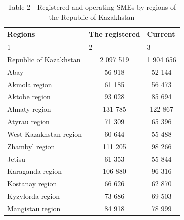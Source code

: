 \begin{table}[H]
\caption*{Table 2 - Registered and operating SMEs by regions of the Republic of Kazakhstan}
\centering
\begin{tabular}{|lcc|}
\hline
\multicolumn{1}{|l|}{Regions}                 & \multicolumn{1}{l|}{The registered} & \multicolumn{1}{l|}{Current} \\ \hline
\multicolumn{1}{|l|}{1}                       & \multicolumn{1}{l|}{2}             & \multicolumn{1}{l|}{3}       \\ \hline
\multicolumn{1}{|l|}{Republic of Kazakhstan}  & \multicolumn{1}{c|}{2 097 519}     & 1 904 656                    \\ \hline
\multicolumn{1}{|l|}{Abay}                    & \multicolumn{1}{c|}{56 918}        & 52 144                       \\ \hline
\multicolumn{1}{|l|}{Akmola region}           & \multicolumn{1}{c|}{61 185}        & 56 473                       \\ \hline
\multicolumn{1}{|l|}{Aktobe region}           & \multicolumn{1}{c|}{93 028}        & 85 694                       \\ \hline
\multicolumn{1}{|l|}{Almaty region}           & \multicolumn{1}{c|}{131 785}       & 122 867                      \\ \hline
\multicolumn{1}{|l|}{Atyrau region}           & \multicolumn{1}{c|}{71 309}        & 65 396                       \\ \hline
\multicolumn{1}{|l|}{West-Kazakhstan region}  & \multicolumn{1}{c|}{60 644}        & 55 488                       \\ \hline
\multicolumn{1}{|l|}{Zhambyl region}          & \multicolumn{1}{c|}{111 205}       & 98 266                       \\ \hline
\multicolumn{1}{|l|}{Jetisu}                  & \multicolumn{1}{c|}{61 353}        & 55 844                       \\ \hline
\multicolumn{1}{|l|}{Karaganda region}        & \multicolumn{1}{c|}{106 880}       & 96 316                       \\ \hline
\multicolumn{1}{|l|}{Kostanay region}         & \multicolumn{1}{c|}{66 626}        & 62 870                       \\ \hline
\multicolumn{1}{|l|}{Kyzylorda region}        & \multicolumn{1}{c|}{73 686}        & 69 503                       \\ \hline
\multicolumn{1}{|l|}{Mangistau region}        & \multicolumn{1}{c|}{84 918}        & 78 999                       \\ \hline

\end{tabular}
\end{table}
